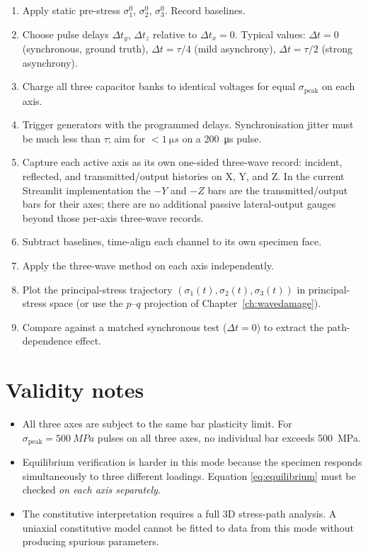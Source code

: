\documentclass[11pt,a4paper,openany]{book}
\providecommand{\SI}[2]{\qty{#1}{#2}}
\theoremstyle{handbook}
\newcommand{\sig}{\sigma}
\newcommand{\sigpeak}{\sig_{\text{peak}}}
\begin{document}
\begin{stepbox}
\begin{enumerate}[leftmargin=*,itemsep=3pt]
  \item Apply static pre-stress $\sig_1^{0}$, $\sig_2^{0}$, $\sig_3^{0}$.
        Record baselines.
  \item Choose pulse delays $\Delta t_y$, $\Delta t_z$ relative to
        $\Delta t_x=0$. Typical values: $\Delta t=0$ (synchronous, ground
        truth), $\Delta t=\tau/4$ (mild asynchrony), $\Delta t=\tau/2$
        (strong asynchrony).
  \item Charge all three capacitor banks to identical voltages for equal
        $\sigpeak$ on each axis.
  \item Trigger generators with the programmed delays. Synchronisation
        jitter must be much less than $\tau$; aim for $<\SI{1}{\micro s}$
        on a \SI{200}{\micro s} pulse.
  \item Capture each active axis as its own one-sided three-wave record:
        incident, reflected, and transmitted/output histories on X, Y, and
        Z. In the current Streamlit implementation the $-Y$ and $-Z$ bars
        are the transmitted/output bars for their axes; there are no
        additional passive lateral-output gauges beyond those per-axis
        three-wave records.
  \item Subtract baselines, time-align each channel to its own specimen
        face.
  \item Apply the three-wave method on each axis independently.
  \item Plot the principal-stress trajectory
        $(\sig_1(t),\sig_2(t),\sig_3(t))$ in principal-stress space (or use
        the $p$--$q$ projection of Chapter~\ref{ch:wavedamage}).
  \item Compare against a matched synchronous test ($\Delta t=0$) to
        extract the path-dependence effect.
\end{enumerate}
\end{stepbox}

\section{Validity notes}

\begin{itemize}[leftmargin=*]
  \item All three axes are subject to the same bar plasticity limit. For
        $\sigpeak=\SI{500}{MPa}$ pulses on all three axes, no individual
        bar exceeds \SI{500}{MPa}.
  \item Equilibrium verification is harder in this mode because the
        specimen responds simultaneously to three different loadings.
        Equation \eqref{eq:equilibrium} must be checked \emph{on each axis
        separately}.
  \item The constitutive interpretation requires a full 3D stress-path
        analysis. A uniaxial constitutive model cannot be fitted to data
        from this mode without producing spurious parameters.
\end{itemize}
\end{document}
